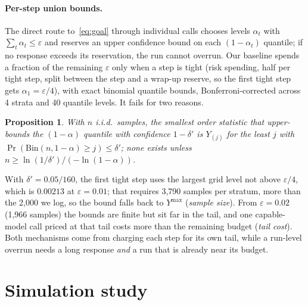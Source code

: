 \documentclass[11pt]{article}
\newtheorem{proposition}{Proposition}
\theoremstyle{remark}
\begin{document}
\paragraph{Per-step union bounds.}
The direct route to~\eqref{eq:goal} through individual calls chooses levels
$\alpha_t$ with $\sum_t \alpha_t \le \varepsilon$ and reserves an upper
confidence bound on each $(1-\alpha_t)$ quantile; if no response exceeds its
reservation, the run cannot overrun. Our baseline spends a fraction of the
remaining $\varepsilon$ only when a step is tight (risk spending, half per
tight step, split between the step and a wrap-up reserve, so the first tight
step gets $\alpha_1 = \varepsilon/4$), with exact binomial quantile bounds,
Bonferroni-corrected across 4 strata and 40 quantile levels. It fails for two
reasons.

\begin{proposition}\label{prop:perstep}
With $n$ i.i.d.\ samples, the smallest order statistic that upper-bounds the
$(1-\alpha)$ quantile with confidence $1-\delta'$ is $Y_{(j)}$ for the least $j$
with $\Pr(\mathrm{Bin}(n,1-\alpha) \ge j) \le \delta'$; none exists unless
$n \ge \ln(1/\delta')/(-\ln(1-\alpha))$.
\end{proposition}

With $\delta' = 0.05/160$, the first tight step uses the largest grid level
not above $\varepsilon/4$, which is $0.00213$ at $\varepsilon = 0.01$; that
requires 3{,}790 samples per stratum, more than the 2{,}000 we log, so the bound
falls back to $Y^{\max}$ (\emph{sample size}). From $\varepsilon = 0.02$
(1{,}966 samples) the bounds are finite but sit far in the tail, and one
capable-model call priced at that tail costs more than the remaining budget
(\emph{tail cost}). Both
mechanisms come from charging each step for its own tail, while a run-level
overrun needs a long response \emph{and} a run that is already near its budget.

\section{Simulation study}\label{sec:sim}
\end{document}
